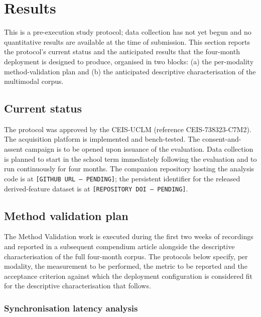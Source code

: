 \section{Results}\label{sec:results}

This is a pre-execution study protocol; data collection has not yet begun and no quantitative results are available at the time of submission. This section reports the protocol's current status and the anticipated results that the four-month deployment is designed to produce, organised in two blocks: (a) the per-modality method-validation plan and (b) the anticipated descriptive characterisation of the multimodal corpus.

\subsection{Current status}\label{subsec:status}

The protocol was approved by the CEIS-UCLM (reference CEIS-738323-C7M2). The acquisition platform is implemented and bench-tested. The consent-and-assent campaign is to be opened upon issuance of the evaluation. Data collection is planned to start in the school term immediately following the evaluation and to run continuously for four months. The companion repository hosting the analysis code is at \texttt{[GITHUB URL --- PENDING]}; the persistent identifier for the released derived-feature dataset is at \texttt{[REPOSITORY DOI --- PENDING]}.

\subsection{Method validation plan}\label{subsec:method-validation}

The Method Validation work is executed during the first two weeks of recordings and reported in a subsequent compendium article alongside the descriptive characterisation of the full four-month corpus. The protocols below specify, per modality, the measurement to be performed, the metric to be reported and the acceptance criterion against which the deployment configuration is considered fit for the descriptive characterisation that follows.

\subsubsection{Synchronisation latency analysis}\label{subsec:val-sync}

